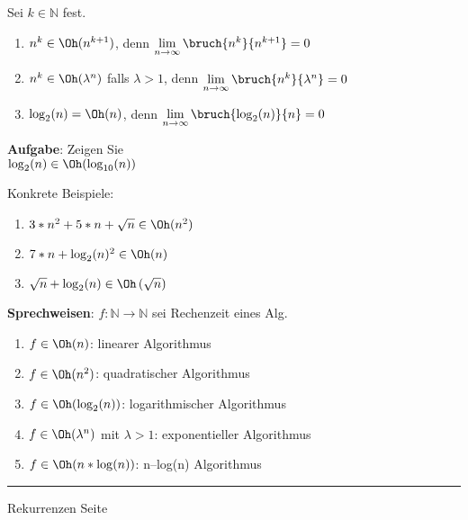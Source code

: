 
\begin{slide}{}

\footnotesize
Sei $k \in \mathbb{N}$ fest.
\begin{enumerate}
\item $n^k \in \Oh(n^{k+1})$, \quad denn $\lim\limits_{n \rightarrow \infty} \bruch{n^k}{n^{k+1}} = 0$
\item $n^k \in \Oh(\lambda^n)$ falls $\lambda > 1$, denn  $\lim\limits_{n \rightarrow \infty} \bruch{n^k}{\lambda^n} = 0$ 
\item $\log_2(n) = \Oh(n)$, denn $\lim\limits_{n \rightarrow \infty} \bruch{\log_2(n)}{n} = 0$
\end{enumerate}

\textbf{Aufgabe}: Zeigen Sie \\[0.3cm]
\hspace*{1.3cm} $\log_{2}(n) \in \Oh(\log_{10}(n))$

Konkrete Beispiele:
\begin{enumerate}
\item $3 * n^2 + 5 * n + \sqrt{n} \in \Oh(n^2)$
\item $7 * n + \log_2(n)^2 \in \Oh(n)$
\item $\sqrt{n} + \log_2(n) \in \Oh\left(\sqrt{n}\right)$
\end{enumerate}

\textbf{Sprechweisen}: $f:\mathbb{N} \rightarrow  \mathbb{N}$ sei Rechenzeit eines Alg.
\begin{enumerate}
\item $f\in \Oh(n)$: linearer Algorithmus
\item $f\in \Oh(n^2)$: quadratischer Algorithmus
\item $f\in \Oh(\log_2(n))$: logarithmischer Algorithmus
\item $f\in \Oh(\lambda^n)$ mit $\lambda > 1$: exponentieller Algorithmus
\item $f\in \Oh(n*\log(n))$: n--log(n) Algorithmus
\end{enumerate}

\vspace*{\fill}
\tiny \addtocounter{mypage}{1}
\rule{17cm}{1mm}
Rekurrenzen  \hspace*{\fill} Seite 
\end{slide}


